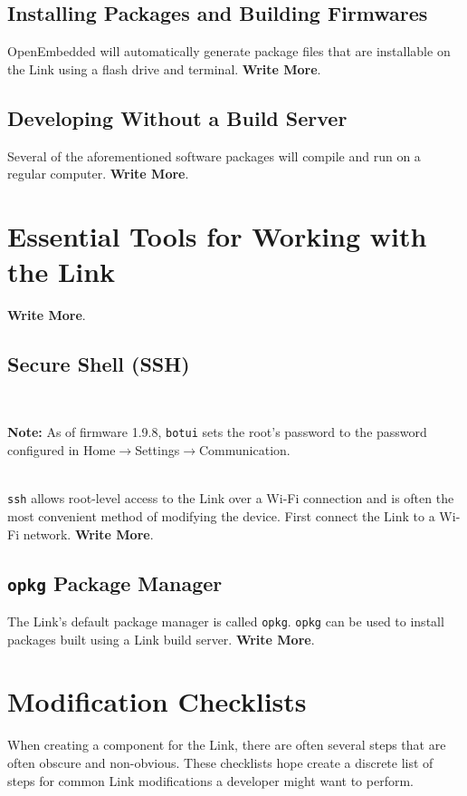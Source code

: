 \documentclass[12pt,letterpaper]{article}
\newcommand{\bcolorbox}[4]{\noindent \\ \fcolorbox{#1}{#2} {\parbox{\textwidth}{\vspace{.1em}\textbf{#3} #4\vspace{.1em}}} \\}
\newcommand{\note}[1]{\bcolorbox{yellow}{Seashell}{Note:}{#1}}
\begin{document}
	\subsection{Installing Packages and Building Firmwares}
	OpenEmbedded will automatically generate package files that are installable on the Link using a flash drive and terminal. \textbf{Write More}.
	
	\subsection{Developing Without a Build Server}
	Several of the aforementioned software packages will compile and run on a regular computer. \textbf{Write More}.
	
	\section{Essential Tools for Working with the Link}
	 \textbf{Write More}.
	
	\subsection{Secure Shell (SSH)}
	\note{As of firmware 1.9.8, \texttt{botui} sets the root's password to the password configured in
	Home$\rightarrow$Settings$\rightarrow$Communication.}
	
	\texttt{ssh} allows root-level access to the Link over a Wi-Fi connection and is often the most convenient method of
	modifying the device. First connect the Link to a Wi-Fi network. \textbf{Write More}.
	
	\subsection{\texttt{opkg} Package Manager}
	The Link's default package manager is called \texttt{opkg}. \texttt{opkg} can be used to install packages built using
	a Link build server. \textbf{Write More}.
	
	\section{Modification Checklists}
	When creating a component for the Link, there are often several steps that are often obscure and non-obvious. These checklists
	hope create a discrete list of steps for common Link modifications a developer might want to perform.
	
\end{document}
